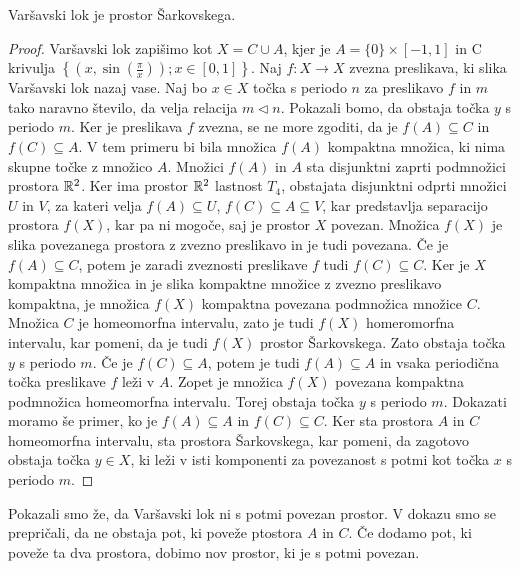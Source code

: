\documentclass[../TG_magistrsko_delo_sections.tex]{subfiles}
\begin{document}
\begin{trditev}
Varšavski lok je prostor Šarkovskega.
\end{trditev}
\begin{proof}
Varšavski lok zapišimo kot $X = C \cup A$, kjer je $A= \{0\} \times [-1, 1]$ in C krivulja $\left\{\left(x, \sin\left(\frac{\pi}{x}\right)\right); x\in [0, 1]\right\}$. Naj $f \colon X \to X$ zvezna preslikava, ki slika Varšavski lok nazaj vase. Naj bo $x \in X$ točka s periodo $n$ za preslikavo $f$ in $m$ tako naravno število, da velja relacija $m \triangleleft n$. Pokazali bomo, da obstaja točka $y$ s periodo $m$. Ker je preslikava $f$ zvezna, se ne more zgoditi, da je $f(A) \subseteq C$ in $f(C) \subseteq A$. V tem primeru bi bila množica $f(A)$ kompaktna množica, ki nima skupne točke z množico $A$. Množici $f(A)$ in $A$ sta disjunktni zaprti podmnožici prostora $\mathbb R^2$. Ker ima prostor $\mathbb R^2$ lastnost $T_4$, obstajata disjunktni odprti množici $U$ in $V$, za kateri velja $f(A) \subseteq U$, $f(C) \subseteq A \subseteq V$, kar predstavlja separacijo prostora $f(X)$, kar pa ni mogoče, saj je prostor $X$ povezan. Množica $f(X)$ je slika povezanega prostora z zvezno preslikavo in je tudi povezana. Če je $f(A) \subseteq C$, potem je zaradi zveznosti preslikave $f$ tudi $f(C) \subseteq C$. Ker je $X$ kompaktna množica in je slika kompaktne množice z zvezno preslikavo kompaktna, je množica $f(X)$ kompaktna povezana podmnožica množice $C$. Množica $C$ je homeomorfna intervalu, zato je tudi $f(X)$ homeromorfna intervalu, kar pomeni, da je tudi $f(X)$ prostor Šarkovskega. Zato obstaja točka $y$ s periodo $m$. Če je $f (C) \subseteq A $, potem je tudi $f (A) \subseteq A $ in vsaka periodična točka preslikave $f$ leži v $A$.  Zopet je množica $f(X)$ povezana kompaktna podmnožica homeomorfna intervalu. Torej obstaja točka $y$ s periodo $m$. 
Dokazati moramo še primer, ko je $f (A) \subseteq A $ in $f (C) \subseteq C $. Ker sta prostora $A$ in $C$ homeomorfna intervalu, sta prostora Šarkovskega, kar pomeni, da zagotovo obstaja točka $y \in X$, ki leži v isti komponenti za povezanost s potmi kot točka $x$ s periodo $m$.
\end{proof}

Pokazali smo že, da Varšavski lok ni s potmi povezan prostor. V dokazu smo se prepričali, da ne obstaja pot, ki poveže ptostora $A$ in $C$. Če dodamo pot, ki poveže ta dva prostora, dobimo nov prostor, ki je s potmi povezan.
\end{document}
